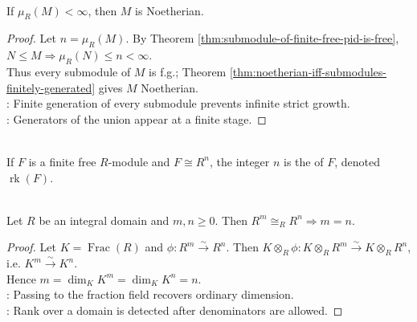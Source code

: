 \begin{corollary} \label{cor:finitely-generated-pid-modules-noetherian} \\
If $\mu_R(M)<\infty$, then $M$ is Noetherian.
\begin{proof} Let $n=\mu_R(M)$. By Theorem \ref{thm:submodule-of-finite-free-pid-is-free}, $N\leq M\Longrightarrow \mu_R(N)\leq n<\infty$.\\
Thus every submodule of $M$ is f.g.; Theorem \ref{thm:noetherian-iff-submodules-finitely-generated} gives $M$ Noetherian.\\
: Finite generation of every submodule prevents infinite strict growth.\\
: Generators of the union appear at a finite stage.
\end{proof}
\end{corollary}

\begin{definition} \label{def:rank-finite-free-module-pid} \\
If $F$ is a finite free $R$-module and $F\cong R^n$, the integer $n$ is the  of $F$, denoted $\operatorname{rk}(F)$.
\end{definition}

\begin{proposition} \label{prop:finite-free-rank-well-defined-domain} \\
Let $R$ be an integral domain and $m,n\geq0$. Then $R^m\cong_R R^n\Longrightarrow m=n$.
\begin{proof}
Let $K=\operatorname{Frac}(R)$ and $\phi:R^m\xrightarrow{\sim}R^n$. Then $K\otimes_R\phi:K\otimes_R R^m\xrightarrow{\sim}K\otimes_R R^n$, i.e. $K^m\xrightarrow{\sim}K^n$.\\
Hence $m=\dim_KK^m=\dim_KK^n=n$.\\
: Passing to the fraction field recovers ordinary dimension.\\
: Rank over a domain is detected after denominators are allowed.
\end{proof}
\end{proposition}

